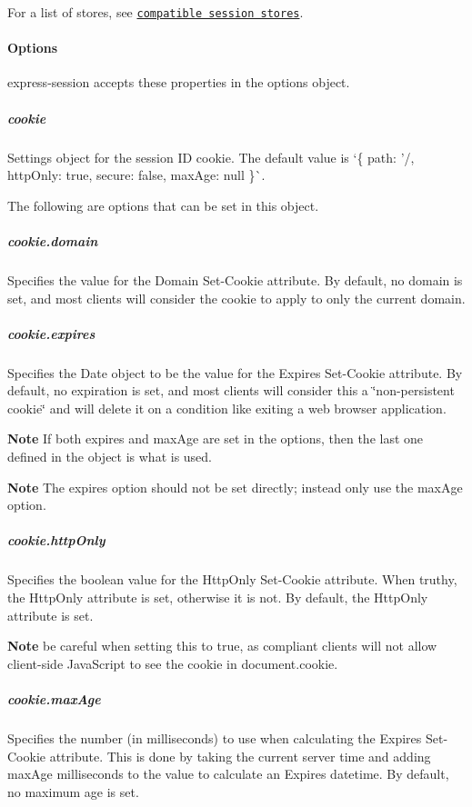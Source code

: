 For a list of stores, see \href{#compatible-session-stores}{\tt compatible session stores}.

\paragraph*{Options}

{\ttfamily express-\/session} accepts these properties in the options object.

\subparagraph*{cookie}

Settings object for the session ID cookie. The default value is `\{ path\+: '/\textquotesingle{}, http\+Only\+: true, secure\+: false, max\+Age\+: null \}\`{}.

The following are options that can be set in this object.

\subparagraph*{cookie.\+domain}

Specifies the value for the {\ttfamily Domain} {\ttfamily Set-\/\+Cookie} attribute. By default, no domain is set, and most clients will consider the cookie to apply to only the current domain.

\subparagraph*{cookie.\+expires}

Specifies the {\ttfamily Date} object to be the value for the {\ttfamily Expires} {\ttfamily Set-\/\+Cookie} attribute. By default, no expiration is set, and most clients will consider this a \char`\"{}non-\/persistent cookie\char`\"{} and will delete it on a condition like exiting a web browser application.

{\bfseries Note} If both {\ttfamily expires} and {\ttfamily max\+Age} are set in the options, then the last one defined in the object is what is used.

{\bfseries Note} The {\ttfamily expires} option should not be set directly; instead only use the {\ttfamily max\+Age} option.

\subparagraph*{cookie.\+http\+Only}

Specifies the {\ttfamily boolean} value for the {\ttfamily Http\+Only} {\ttfamily Set-\/\+Cookie} attribute. When truthy, the {\ttfamily Http\+Only} attribute is set, otherwise it is not. By default, the {\ttfamily Http\+Only} attribute is set.

{\bfseries Note} be careful when setting this to {\ttfamily true}, as compliant clients will not allow client-\/side Java\+Script to see the cookie in {\ttfamily document.\+cookie}.

\subparagraph*{cookie.\+max\+Age}

Specifies the {\ttfamily number} (in milliseconds) to use when calculating the {\ttfamily Expires} {\ttfamily Set-\/\+Cookie} attribute. This is done by taking the current server time and adding {\ttfamily max\+Age} milliseconds to the value to calculate an {\ttfamily Expires} datetime. By default, no maximum age is set.

